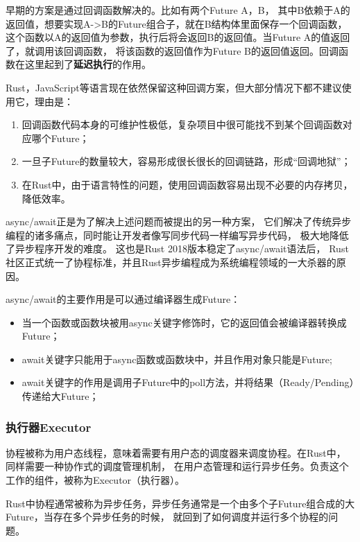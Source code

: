 \documentclass[supercite]{HustGraduPaper}
\theoremstyle{definition}
\begin{document}
早期的方案是通过回调函数解决的。比如有两个Future A，B，
其中B依赖于A的返回值，想要实现A->B的Future组合子，就在B结构体里面保存一个回调函数，
这个函数以A的返回值为参数，执行后将会返回B的返回值。当Future A的值返回了，就调用该回调函数，
将该函数的返回值作为Future B的返回值返回。回调函数在这里起到了\textbf{延迟执行}的作用。\par

Rust，JavaScript等语言现在依然保留这种回调方案，但大部分情况下都不建议使用它，理由是：
\begin{enumerate}
  \item 回调函数代码本身的可维护性极低，复杂项目中很可能找不到某个回调函数对应哪个Future；
  \item 一旦子Future的数量较大，容易形成很长很长的回调链路，形成“回调地狱”；
  \item 在Rust中，由于语言特性的问题，使用回调函数容易出现不必要的内存拷贝，降低效率。
\end{enumerate}

async/await正是为了解决上述问题而被提出的另一种方案，
它们解决了传统异步编程的诸多痛点，同时能让开发者像写同步代码一样编写异步代码，
极大地降低了异步程序开发的难度。
这也是Rust 2018版本稳定了async/await语法后，
Rust社区正式统一了协程标准，并且Rust异步编程成为系统编程领域的一大杀器的原因。

async/await的主要作用是可以通过编译器生成Future：
\begin{itemize}
  \item 当一个函数或函数块被用async关键字修饰时，它的返回值会被编译器转换成Future；
  \item await关键字只能用于async函数或函数块中，并且作用对象只能是Future;
  \item await关键字的作用是调用子Future中的poll方法，并将结果（Ready/Pending）传递给大Future；
\end{itemize}

\subsubsection{执行器Executor}
协程被称为用户态线程，意味着需要有用户态的调度器来调度协程。在Rust中，同样需要一种协作式的调度管理机制，
在用户态管理和运行异步任务。负责这个工作的组件，被称为Executor（执行器）。\par

Rust中协程通常被称为异步任务，异步任务通常是一个由多个子Future组合成的大Future，当存在多个异步任务的时候，
就回到了如何调度并运行多个协程的问题。\par
\end{document}
